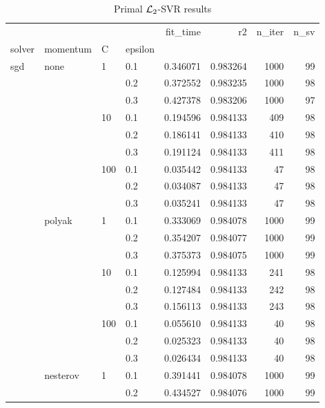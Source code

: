\begin{table}[H]
\centering
\caption{Primal $\protect \mathcal{L}_2$-SVR results}
\label{primal_l2_svr_cv_results}
\begin{tabular}{llllrrrr}
\toprule
          &   &     &     &  fit\_time &        r2 &  n\_iter &  n\_sv \\
solver & momentum & C & epsilon &           &           &         &       \\
\midrule
sgd & none & 1   & 0.1 &  0.346071 &  0.983264 &    1000 &    99 \\
          &   &     & 0.2 &  0.372552 &  0.983235 &    1000 &    98 \\
          &   &     & 0.3 &  0.427378 &  0.983206 &    1000 &    97 \\
          &   & 10  & 0.1 &  0.194596 &  0.984133 &     409 &    98 \\
          &   &     & 0.2 &  0.186141 &  0.984133 &     410 &    98 \\
          &   &     & 0.3 &  0.191124 &  0.984133 &     411 &    98 \\
          &   & 100 & 0.1 &  0.035442 &  0.984133 &      47 &    98 \\
          &   &     & 0.2 &  0.034087 &  0.984133 &      47 &    98 \\
          &   &     & 0.3 &  0.035241 &  0.984133 &      47 &    98 \\
          & polyak & 1   & 0.1 &  0.333069 &  0.984078 &    1000 &    99 \\
          &   &     & 0.2 &  0.354207 &  0.984077 &    1000 &    99 \\
          &   &     & 0.3 &  0.375373 &  0.984075 &    1000 &    99 \\
          &   & 10  & 0.1 &  0.125994 &  0.984133 &     241 &    98 \\
          &   &     & 0.2 &  0.127484 &  0.984133 &     242 &    98 \\
          &   &     & 0.3 &  0.156113 &  0.984133 &     243 &    98 \\
          &   & 100 & 0.1 &  0.055610 &  0.984133 &      40 &    98 \\
          &   &     & 0.2 &  0.025323 &  0.984133 &      40 &    98 \\
          &   &     & 0.3 &  0.026434 &  0.984133 &      40 &    98 \\
          & nesterov & 1   & 0.1 &  0.391441 &  0.984078 &    1000 &    99 \\
          &   &     & 0.2 &  0.434527 &  0.984076 &    1000 &    99 \\

\end{tabular}
\end{table}

